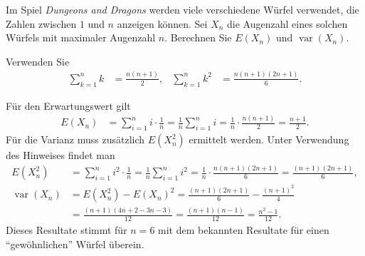 Im Spiel {\it Dungeons and Dragons} werden viele verschiedene Würfel
verwendet, die Zahlen zwischen $1$ und $n$ anzeigen können. Sei $X_n$ 
die Augenzahl eines solchen Würfels mit maximaler Augenzahl $n$. 
Berechnen Sie $E(X_n)$ und $\operatorname{var}(X_n)$.

\begin{hinweis}
Verwenden Sie
\begin{align*}
\sum_{k=1}^nk&=\frac{n(n+1)}2,&
\sum_{k=1}^nk^2&=\frac{n(n+1)(2n+1)}6.
\end{align*}
\end{hinweis}


\begin{loesung}
Für den Erwartungswert gilt
\begin{align*}
E(X_n)&=\sum_{i=1}^n i\cdot \frac1n=\frac1n\sum_{i=1}^ni
=\frac1n\cdot\frac{n(n+1)}2=\frac{n+1}2.
\end{align*}
Für die Varianz muss zusätzlich $E(X_n^2)$ ermittelt werden.
Unter Verwendung des Hinweises findet man
\begin{align*}
E(X_n^2)&=\sum_{i=1}^n i^2\cdot \frac1n=\frac1n\sum_{i=1}^ni^2
=\frac1n\cdot\frac{n(n+1)(2n+1)}6
=\frac{(n+1)(2n+1)}6,\\
\operatorname{var}(X_n)&=E(X_n^2)-E(X_n)^2
=\frac{(n+1)(2n+1)}6-\frac{(n+1)^2}4\\
&=\frac{(n+1)(4n + 2 - 3n - 3)}{12}
=\frac{(n+1)(n - 1)}{12}
=\frac{n^2-1}{12}.
\end{align*}
Dieses Resultate stimmt für $n=6$ mit dem bekannten Resultate für einen
``gewöhnlichen'' Würfel überein.
\end{loesung}
